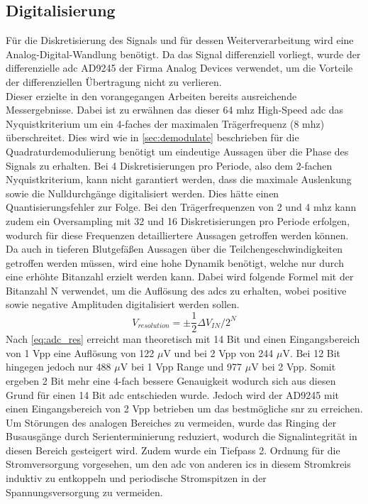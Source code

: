 \subsection{Digitalisierung}
Für die Diskretisierung des Signals und für dessen Weiterverarbeitung wird eine Analog-Digital-Wandlung benötigt. Da das Signal differenziell vorliegt, wurde der differenzielle \ac{adc} AD9245 der Firma Analog Devices verwendet, um die Vorteile der differenziellen Übertragung nicht zu verlieren.\cite{ad9245} \\%
Dieser erzielte in den vorangegangen Arbeiten bereits ausreichende Messergebnisse. Dabei ist zu erwähnen das dieser 64 \ac{mhz} High-Speed \ac{adc} das Nyquistkriterium um ein 4-faches der maximalen Trägerfrequenz (8 \ac{mhz}) überschreitet. Dies wird wie in \autoref{sec:demodulate} beschrieben für die Quadraturdemodulierung benötigt um eindeutige Aussagen über die Phase des Signals zu erhalten. Bei 4 Diskretisierungen pro Periode, also dem 2-fachen Nyquistkriterium, kann nicht garantiert werden, dass die maximale Auslenkung sowie die Nulldurchgänge digitalisiert werden. Dies hätte einen Quantisierungsfehler zur Folge. Bei den Trägerfrequenzen von 2 und 4 \ac{mhz} kann zudem ein Oversampling mit 32 und 16 Diskretisierungen pro Periode erfolgen, wodurch für diese Frequenzen detailliertere Aussagen getroffen werden können.\\
Da auch in tieferen Blutgefäßen Aussagen über die Teilchengeschwindigkeiten getroffen werden müssen, wird eine hohe Dynamik benötigt, welche nur durch eine erhöhte Bitanzahl erzielt werden kann. Dabei wird folgende Formel mit der Bitanzahl N verwendet, um die Auflösung des \ac{adc}s zu erhalten, wobei positive sowie negative Amplituden digitalisiert werden sollen.\cite[p. 59]{lattice_adc}
\begin{equation}
V_{resolution} =\pm\frac{1}{2}\Delta V_{IN}/2^{N}\label{eq:adc_res}
\end{equation}
Nach \autoref{eq:adc_res} erreicht man theoretisch mit 14 Bit und einen Eingangsbereich von 1 V\ac{pp} eine Auflösung von 122 $\mu$V und bei 2 V\ac{pp} von 244 $\mu$V. Bei 12 Bit hingegen jedoch nur 488 $\mu$V bei 1 V\ac{pp} Range und 977 $\mu$V bei 2 V\ac{pp}. Somit ergeben 2 Bit mehr eine 4-fach bessere Genauigkeit wodurch sich aus diesen Grund für einen 14 Bit \ac{adc} entschieden wurde. Jedoch wird der AD9245 mit einen Eingangsbereich von 2 V\ac{pp} betrieben um das bestmögliche \ac{snr} zu erreichen.\cite[p. 18]{ad9245}\\
Um Störungen des analogen Bereiches zu vermeiden, wurde das Ringing der Busausgänge durch Serienterminierung reduziert, wodurch die Signalintegrität in diesen Bereich gesteigert wird. Zudem wurde ein Tiefpass 2. Ordnung für die Stromversorgung vorgesehen, um den \ac{adc} von anderen \ac{ic}s in diesem Stromkreis induktiv zu entkoppeln und periodische Stromspitzen in der Spannungsversorgung zu vermeiden.
%
%
%
